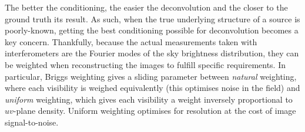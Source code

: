 \pg
The better the conditioning, the easier the deconvolution and the closer to the ground truth its result. As such, when the true underlying structure of a source is poorly-known, getting the best conditioning possible for deconvolution becomes a key concern. Thankfully, because the actual measurements taken with interferometers are the Fourier modes of the sky brightness distribution, they can be weighted when reconstructing the images to fulfill specific requirements. In particular, Briggs weighting  gives a sliding parameter between \emph{natural} weighting, where each visibility is weighed equivalently (this optimises noise in the field) and \emph{uniform} weighting, which gives each visibility a weight inversely proportional to $uv$-plane density. Uniform weighting optimises for resolution at the cost of image signal-to-noise.

